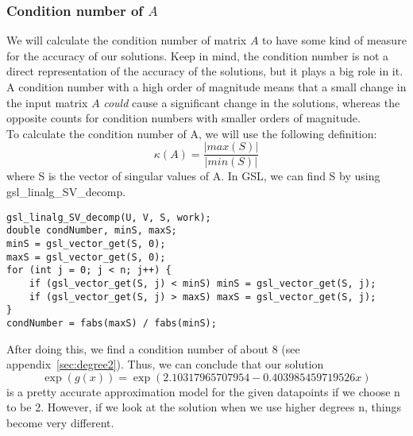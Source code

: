 \documentclass[11pt, a4paper, titlepage, openright]{article}
\begin{document}
    \subsubsection{Condition number of \(A\)}
    We will calculate the condition number of matrix \(A\) to have some kind of measure for the accuracy of our solutions. Keep in mind, the condition number
    is not a direct representation of the accuracy of the solutions, but it plays a big role in it. A condition number with a high order of magnitude
    means that a small change in the input matrix \(A\) \emph{could} cause a significant change in the solutions, 
    whereas the opposite counts for condition numbers with smaller orders of magnitude.\\
    To calculate the condition number of A, we will use the following definition: \[\kappa(A)= \frac{|max(S)|}{|min(S)|} \]
    where S is the vector of singular values of A. In GSL, we can find S by using gsl\_linalg\_SV\_decomp.
\begin{lstlisting}
gsl_linalg_SV_decomp(U, V, S, work);
double condNumber, minS, maxS;
minS = gsl_vector_get(S, 0);
maxS = gsl_vector_get(S, 0);
for (int j = 0; j < n; j++) {
    if (gsl_vector_get(S, j) < minS) minS = gsl_vector_get(S, j);
    if (gsl_vector_get(S, j) > maxS) maxS = gsl_vector_get(S, j);
}
condNumber = fabs(maxS) / fabs(minS);
\end{lstlisting}
    After doing this, we find a condition number of about 8 (see appendix~\ref{sec:degree2}). 
    Thus, we can conclude that our solution \[ \exp(g(x)) = \exp(2.10317965707954 - 0.403985459719526x) \]
    is a pretty accurate approximation model for the given datapoints if we choose n to be 2. 
    However, if we look at the solution when we use higher degrees n, things become very different.
    
\end{document}
